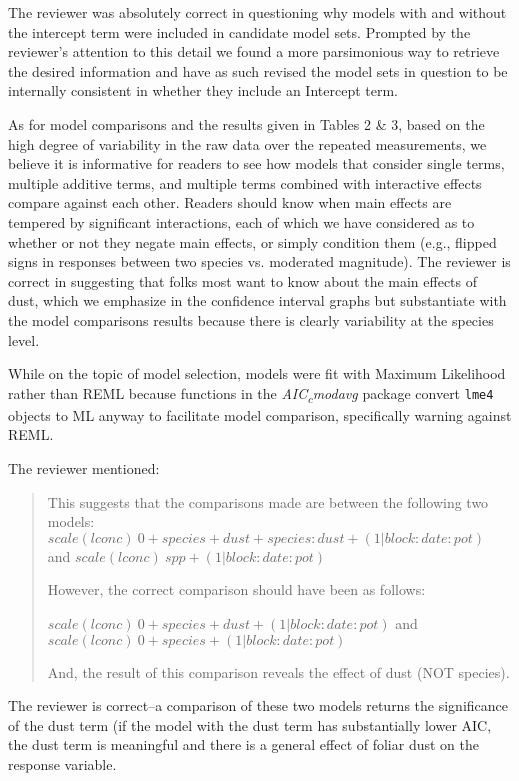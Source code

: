 \documentclass[parskip=half]{scrartcl}
\begin{document}
The reviewer was absolutely correct in questioning why models with and without the intercept term were included in candidate model sets. 
Prompted by the reviewer's attention to this detail we found a more parsimonious way to retrieve the desired information and have as such revised the model sets in question to be internally consistent in whether they include an Intercept term. 
 

As for model comparisons and the results given in Tables 2 \& 3, based on the high degree of variability in the raw data over the repeated measurements, we believe it is informative for readers to see how models that consider single terms, multiple additive terms, and multiple terms combined with interactive effects compare against each other. 
Readers should know when main effects are tempered by significant interactions, each of which we have considered as to whether or not they negate main effects, or simply condition them (e.g., flipped signs in responses between two species vs. moderated magnitude). 
The reviewer is correct in suggesting that folks most want to know about the main effects of dust, which we emphasize in the confidence interval graphs but substantiate with the model comparisons results because there is clearly variability at the species level.

While on the topic of model selection, models were fit with Maximum Likelihood rather than REML because functions in the \emph{AIC\textsubscript{c}modavg} package convert \texttt{lme4} objects to ML anyway to facilitate model comparison, specifically warning against REML. 

The reviewer mentioned: 

\begin{quote}
This suggests that the comparisons made are between the following two models:
$scale(lconc) ~ 0 + species + dust + species:dust + (1|block:date:pot)$ and
$scale(lconc) ~ spp + (1|block:date:pot)$

However, the correct comparison should have been as follows:

$scale(lconc) ~ 0 + species + dust + (1|block:date:pot)$ and
$scale(lconc) ~ 0 + species  + (1|block:date:pot)$ 

And, the result of this comparison reveals the effect of dust (NOT species).
\end{quote}

The reviewer is correct--a comparison of these two models returns the significance of the dust term (if the model with the dust term has substantially lower AIC, the dust term is meaningful and there is a general effect of foliar dust on the response variable. 
\end{document}
